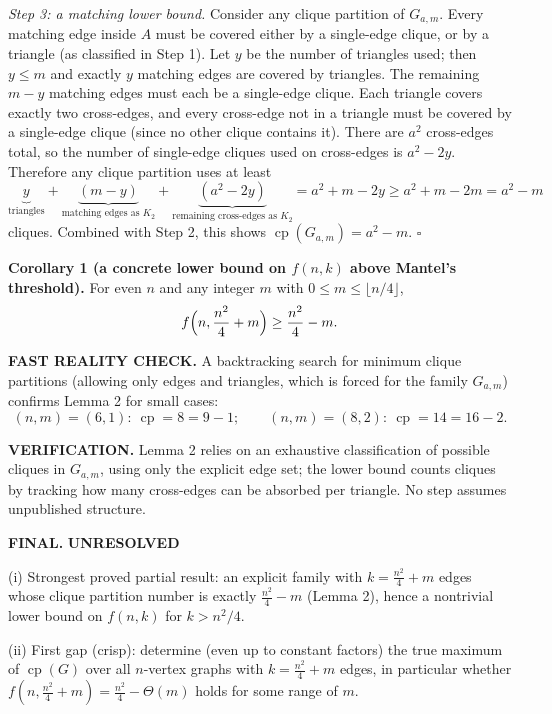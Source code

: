 \emph{Step 3: a matching lower bound.}
Consider any clique partition of $G_{a,m}$.
Every matching edge inside $A$ must be covered either by a single-edge clique, or by a triangle (as classified in Step 1).
Let $y$ be the number of triangles used; then $y\le m$ and exactly $y$ matching edges are covered by triangles.
The remaining $m-y$ matching edges must each be a single-edge clique.
Each triangle covers exactly two cross-edges, and every cross-edge not in a triangle must be covered by a single-edge clique (since no other clique contains it).
There are $a^2$ cross-edges total, so the number of single-edge cliques used on cross-edges is $a^2-2y$.
Therefore any clique partition uses at least
\[
\underbrace{y}_{\text{triangles}} + \underbrace{(m-y)}_{\text{matching edges as }K_2} + \underbrace{(a^2-2y)}_{\text{remaining cross-edges as }K_2}
= a^2+m-2y\ge a^2+m-2m=a^2-m
\]
cliques.
Combined with Step 2, this shows $\operatorname{cp}(G_{a,m})=a^2-m$.
\hfill$\square$

\medskip
\noindent\textbf{Corollary 1 (a concrete lower bound on $f(n,k)$ above Mantel's threshold).}
For even $n$ and any integer $m$ with $0\le m\le \lfloor n/4\rfloor$,
\[
f\Bigl(n,\frac{n^2}{4}+m\Bigr)\ge \frac{n^2}{4}-m.
\]

\medskip
\noindent\textbf{FAST REALITY CHECK.}
A backtracking search for minimum clique partitions (allowing only edges and triangles, which is forced for the family $G_{a,m}$) confirms Lemma 2 for small cases:
\[
(n,m)=(6,1):\ \operatorname{cp}=8=9-1;\qquad (n,m)=(8,2):\ \operatorname{cp}=14=16-2.
\]

\medskip
\noindent\textbf{VERIFICATION.}
Lemma 2 relies on an exhaustive classification of possible cliques in $G_{a,m}$, using only the explicit edge set; the lower bound counts cliques by tracking how many cross-edges can be absorbed per triangle.
No step assumes unpublished structure.

\medskip
\noindent\textbf{FINAL.}
\textbf{UNRESOLVED}

(i) Strongest proved partial result: an explicit family with $k=\frac{n^2}{4}+m$ edges whose clique partition number is exactly $\frac{n^2}{4}-m$ (Lemma 2), hence a nontrivial lower bound on $f(n,k)$ for $k>n^2/4$.

(ii) First gap (crisp): determine (even up to constant factors) the true maximum of $\operatorname{cp}(G)$ over all $n$-vertex graphs with $k=\frac{n^2}{4}+m$ edges, in particular whether $f(n,\frac{n^2}{4}+m)=\frac{n^2}{4}-\Theta(m)$ holds for some range of $m$.

